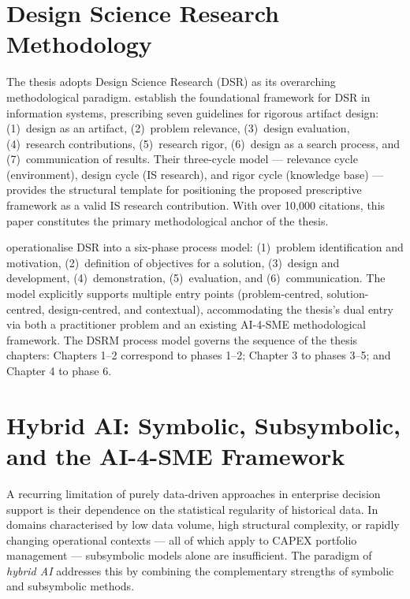 \section{Design Science Research Methodology}
\label{sec:lit_dsr}

The thesis adopts Design Science Research (DSR) as its overarching methodological paradigm.
\textcite{hevner2004design} establish the foundational framework for DSR in information systems,
prescribing seven guidelines for rigorous artifact design: (1)~design as an artifact,
(2)~problem relevance, (3)~design evaluation, (4)~research contributions, (5)~research rigor,
(6)~design as a search process, and (7)~communication of results. Their three-cycle model
— relevance cycle (environment), design cycle (IS research), and rigor cycle (knowledge base)
— provides the structural template for positioning the proposed prescriptive framework as a
valid IS research contribution. With over 10{,}000 citations, this paper constitutes the
primary methodological anchor of the thesis.

\textcite{peffers2007dsrm} operationalise DSR into a six-phase process model: (1)~problem
identification and motivation, (2)~definition of objectives for a solution, (3)~design and
development, (4)~demonstration, (5)~evaluation, and (6)~communication. The model explicitly
supports multiple entry points (problem-centred, solution-centred, design-centred, and
contextual), accommodating the thesis's dual entry via both a practitioner problem and an
existing AI-4-SME methodological framework. The DSRM process model governs the sequence of
the thesis chapters: Chapters 1--2 correspond to phases 1--2; Chapter 3 to phases 3--5;
and Chapter 4 to phase 6.

\section{Hybrid AI: Symbolic, Subsymbolic, and the AI-4-SME Framework}
\label{sec:lit_hybrid_ai}

A recurring limitation of purely data-driven approaches in enterprise decision support is
their dependence on the statistical regularity of historical data. In domains characterised
by low data volume, high structural complexity, or rapidly changing operational contexts —
all of which apply to CAPEX portfolio management — subsymbolic models alone are insufficient.
The paradigm of \textit{hybrid AI} addresses this by combining the complementary strengths
of symbolic and subsymbolic methods.

